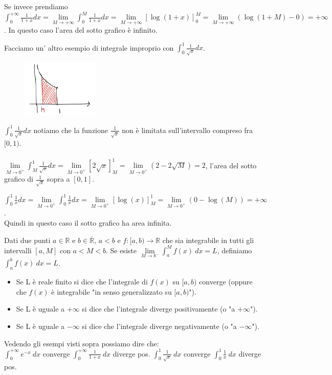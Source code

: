 \begin{example}
Se invece prendiamo $\int_0^{+\infty}\frac{1}{1+x}dx = \lim\limits_{M\to +\infty}\int_0^{M}\frac{1}{1+x}dx = \lim\limits_{M\to +\infty}[\log(1+x)]_0^M = \lim\limits_{M\to +\infty}(\log(1+M)-0) = +\infty$. In questo caso l'area del sotto grafico è infinito.
\end{example}
\newpage
\begin{example}
Facciamo un' altro esempio di integrale improprio con $\int_0^1 \frac{1}{\sqrt{x}}dx$.
\end{example}
\begin{figure}
    \vspace{-25pt}
    \centering
    \includegraphics[width=3.7cm]{images/esempio-intergale-improprio-2.png}
\end{figure}
$\int_0^1 \frac{1}{\sqrt{x}}dx$ notiamo che la funzione $\frac{1}{\sqrt{x}}$ non è limitata sull'intervallo compreso fra $[0,1)$.\\\\
$\lim\limits_{M\to 0^+}\int_M^1 \frac{1}{\sqrt{x}}dx = \lim\limits_{M\to 0^+}[2\sqrt{x}]_M^1 = \lim\limits_{M\to 0^+}(2-2\sqrt{M}) = 2$, l'area del sotto grafico di $\frac{1}{\sqrt{x}}$ sopra a $[0,1]$.
\vspace{10pt}
\begin{example}
$\int_0^1 \frac{1}{x}dx = \lim\limits_{M\to 0^+}\int_0^1 \frac{1}{x}dx = \lim\limits_{M\to 0^+}[\log(x)]_M^1 = \lim\limits_{M\to 0^+} (0-\log(M)) = + \infty$.\\
Quindi in questo caso il sotto grafico ha area infinita.
\end{example}
\begin{definition}
Dati due punti $a\in \mathbb{R}$ e $b \in \mathbb{\overline{R}}$, $a<b$ e $f:[a,b)\to \mathbb{R}$ che sia integrabile in tutti gli intervalli $[a,M]$ con $a<M<b$. Se esiste $\lim\limits_{M\to b^-}\int_a^M f(x)\:dx = L$, definiamo $\int_a^b f(x)\:dx = L$. 
\begin{itemize}
    \item Se L è reale finito si dice che l'integrale di $f(x)$ su $[a,b)$ converge (oppure che $f(x)$ è integrabile "in senso generalizzato su $[a,b)$").
    \item Se L è uguale a $+\infty$ si dice che l'integrale diverge positivamente (o "a $+\infty$").
    \item Se L è uguale a $-\infty$ si dice che l'integrale diverge negativamente (o "a $-\infty$").
\end{itemize}
\end{definition}
\hspace{-15pt}Vedendo gli esempi visti sopra possiamo dire che:\\
$\int_0^{+\infty}e^{-x}\:dx$ converge \hfill $\int_0^{+\infty}\frac{1}{1+x}\:dx$ diverge pos. \hfill $\int_0^1 \frac{1}{\sqrt{x}}\:dx$ converge \hfill $\int_0^1\frac{1}{x}\:dx$ diverge pos.


